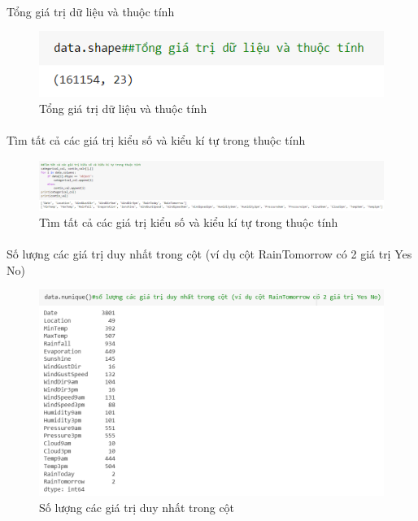 \documentclass{article}
\begin{document}
\paragraph{}Tổng giá trị dữ liệu và thuộc tính
\begin{figure}[!h]
	\begin{center}
		\includegraphics[width=\linewidth]{images/code4.png}
		\caption{\fontsize{14}{20}\selectfont Tổng giá trị dữ liệu và thuộc tính}
	\end{center}
\end{figure}
\paragraph{}Tìm tất cả các giá trị kiểu số và kiểu kí tự trong thuộc tính
\begin{figure}[!h]
	\begin{center}
		\includegraphics[width=\linewidth]{images/code6.png}
		\caption{\fontsize{14}{20}\selectfont Tìm tất cả các giá trị kiểu số và kiểu kí tự trong thuộc tính}
	\end{center}
\end{figure}
\pagebreak{}
\paragraph{}Số lượng các giá trị duy nhất  trong cột (ví dụ cột RainTomorrow có 2 giá trị Yes No)
\begin{figure}[!h]
	\begin{center}
		\includegraphics[width=\linewidth]{images/code7.png}
		\caption{\fontsize{14}{20}\selectfont  Số lượng các giá trị duy nhất  trong cột}
	\end{center}
\end{figure}
\pagebreak{}
\end{document}
